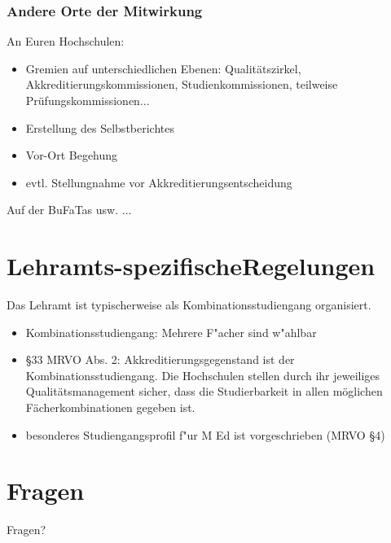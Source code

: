 \documentclass{beamer}
\begin{document}
\begin{frame}
\frametitle{Andere Orte der Mitwirkung}
An Euren Hochschulen:
\begin{itemize}
\item Gremien auf unterschiedlichen Ebenen: Qualitätszirkel, Akkreditierungskommissionen, Studienkommissionen, teilweise Prüfungskommissionen...
\item Erstellung des Selbstberichtes
\item Vor-Ort Begehung
\item evtl. Stellungnahme vor Akkreditierungsentscheidung
\end{itemize}
\vspace*{0.5cm}
Auf der BuFaTas usw. ...
\end{frame}
\section{Lehramts-\glqq spezifische\grqq Regelungen}

\begin{frame}
Das Lehramt ist typischerweise als Kombinationsstudiengang organisiert.
\begin{itemize}
	\item Kombinationsstudiengang: Mehrere F"acher sind w"ahlbar
	\item \S 33 MRVO Abs. 2: Akkreditierungsgegenstand ist der Kombinationsstudiengang. Die Hochschulen stellen durch ihr jeweiliges Qualitätsmanagement sicher, dass die Studierbarkeit in allen möglichen Fächerkombinationen gegeben ist. 
	\item besonderes Studiengangsprofil f"ur M Ed ist vorgeschrieben (MRVO \S 4)
\end{itemize}
\end{frame}

\section*{Fragen}
\begin{frame}
\centering
\Large{ Fragen?}
\end{frame}
\end{document}
